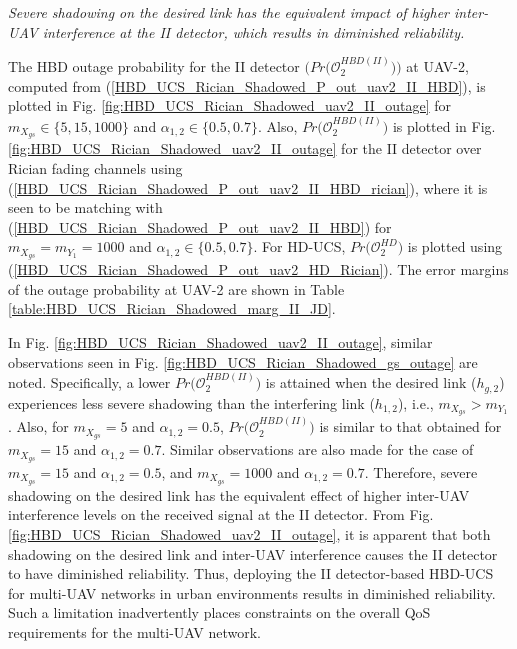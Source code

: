 
\begin{observation}
\emph{\emph{Severe shadowing on the desired link has the equivalent impact of higher inter-UAV interference at the II detector, which results in diminished reliability.}
}\end{observation}

The HBD outage probability for the II detector $\big(Pr\big(\mathcal{O}_{2}^{HBD(II)}\big)\big)$ at UAV-2, computed from (\ref{HBD_UCS_Rician_Shadowed_P_out_uav2_II_HBD}), is plotted in Fig. \ref{fig:HBD_UCS_Rician_Shadowed_uav2_II_outage} for $m_{X_{gs}} \in \{5, 15, 1000\}$ and $\alpha_{1,2} \in \{0.5, 0.7\}$. Also, $Pr\big(\mathcal{O}_{2}^{HBD(II)}\big)$ is plotted in Fig. \ref{fig:HBD_UCS_Rician_Shadowed_uav2_II_outage} for the II detector over Rician fading channels using (\ref{HBD_UCS_Rician_Shadowed_P_out_uav2_II_HBD_rician}), where it is seen to be matching with (\ref{HBD_UCS_Rician_Shadowed_P_out_uav2_II_HBD}) for $m_{X_{gs}}=m_{Y_1}=1000$ and $\alpha_{1,2} \in \{0.5, 0.7\}$. For HD-UCS, $Pr\big(\mathcal{O}_{2}^{HD}\big)$ is plotted using (\ref{HBD_UCS_Rician_Shadowed_P_out_uav2_HD_Rician}). The error margins of the outage probability at UAV-2 are shown in Table \ref{table:HBD_UCS_Rician_Shadowed_marg_II_JD}.

In Fig. \ref{fig:HBD_UCS_Rician_Shadowed_uav2_II_outage}, similar observations seen in Fig. \ref{fig:HBD_UCS_Rician_Shadowed_gs_outage} are noted. Specifically, a lower $Pr\big(\mathcal{O}_{2}^{HBD(II)}\big)$ is attained when the desired link ($h_{g,2}$) experiences less severe shadowing than the interfering link ($h_{1,2}$), i.e., $m_{X_{gs}} > m_{Y_1}$. Also, for $m_{X_{gs}}=5$ and $\alpha_{1,2}=0.5$, $Pr\big(\mathcal{O}_{2}^{HBD(II)}\big)$ is similar to that obtained for $m_{X_{gs}}=15$ and $\alpha_{1,2}=0.7$. Similar observations are also made for the case of $m_{X_{gs}}=15$ and $\alpha_{1,2}=0.5$, and $m_{X_{gs}}=1000$ and $\alpha_{1,2}=0.7$. Therefore, severe shadowing on the desired link has the equivalent effect of higher inter-UAV interference levels on the received signal at the II detector. From Fig. \ref{fig:HBD_UCS_Rician_Shadowed_uav2_II_outage}, it is apparent that both shadowing on the desired link and inter-UAV interference causes the II detector to have diminished reliability. Thus, deploying the II detector-based HBD-UCS for multi-UAV networks in urban environments results in diminished reliability. Such a limitation inadvertently places constraints on the overall QoS requirements for the multi-UAV network.   

